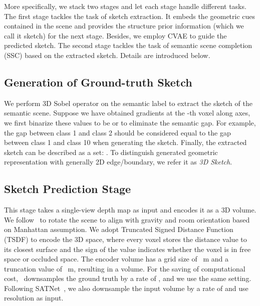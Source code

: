 \documentclass[10pt,twocolumn,letterpaper]{article}
\begin{document}
More specifically, we stack two stages and let each stage handle different tasks. The first stage tackles the task of sketch extraction. It embeds the geometric cues contained in the scene and provides the structure prior information (which we call it sketch) for the next stage. Besides, we employ CVAE to guide the predicted sketch. The second stage tackles the task of semantic scene completion (SSC) based on the extracted sketch. Details are introduced below.

\subsection{Generation of Ground-truth Sketch} We perform 3D Sobel operator on the semantic label to extract the sketch of the semantic scene. Suppose we have obtained gradients  at the -th voxel  along  axes, we first binarize these values to be  or  to eliminate the semantic gap. For example, the gap between class 1 and class 2 should be considered equal to the gap between class 1 and class 10 when generating the sketch. Finally, the extracted sketch can be described as a set: . To distinguish generated geometric representation with generally 2D edge/boundary, we refer it as \textit{3D Sketch}.

\subsection{Sketch Prediction Stage}
This stage takes a single-view depth map as input and encodes it as a 3D volume. We follow~\cite{song2017semantic-sscnet} to rotate the scene to align with gravity and room orientation based on Manhattan assumption. We adopt Truncated Signed Distance Function (TSDF) to encode the 3D space, where every voxel stores the distance value  to its closest surface and the sign of the value indicates whether the voxel is in free space or occluded space. The encoder volume has a grid size of ~m and a truncation value of ~m, resulting in a  volume. For the saving of computational cost,~\cite{song2017semantic-sscnet} downsamples the ground truth by a rate of , and we use the same setting. Following SATNet~\cite{liu2018see-satnet}, we also downsample the input volume by a rate of  and use  resolution as input.
\end{document}
